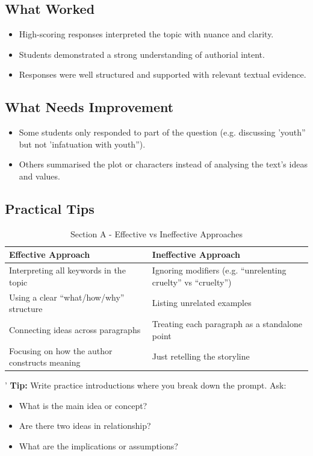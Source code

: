 \documentclass[a4paper]{article}
\begin{document}
\subsection{What Worked}
\begin{itemize}
    \item High-scoring responses interpreted the topic with nuance and clarity.

\item Students demonstrated a strong understanding of authorial intent.

\item Responses were well structured and supported with relevant textual evidence.
\end{itemize}

\subsection{What Needs Improvement}
\begin{itemize}
\item Some students only responded to part of the question (e.g. discussing 'youth” but not 'infatuation with youth”).

\item Others summarised the plot or characters instead of analysing the text’s ideas and values.
\end{itemize}

\subsection{Practical Tips}

\begin{table}[ht]
\centering
\begin{tabular}{|l|l|}
\hline
\textbf{Effective Approach}                      & \textbf{Ineffective Approach}                                  \\ \hline
Interpreting all keywords in the topic           & Ignoring modifiers (e.g. ``unrelenting cruelty'' vs ``cruelty'') \\ \hline
Using a clear ``what/how/why'' structure         & Listing unrelated examples                                      \\ \hline
Connecting ideas across paragraphs             & Treating each paragraph as a standalone point                   \\ \hline
Focusing on how the author constructs meaning    & Just retelling the storyline                                    \\ \hline
\end{tabular}
\caption{Section A - Effective vs Ineffective Approaches}
\end{table}
'
\textbf{Tip:} Write practice introductions where you break down the prompt. Ask:
\begin{itemize}
    \item What is the main idea or concept?

\item Are there two ideas in relationship?

\item What are the implications or assumptions?
\end{itemize}
\end{document}
